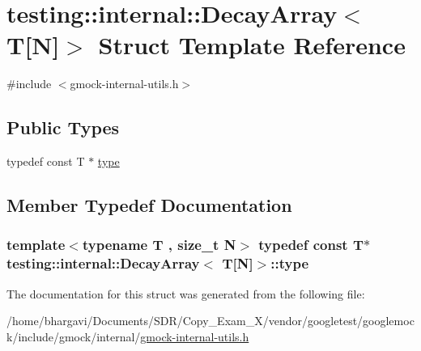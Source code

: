 \hypertarget{structtesting_1_1internal_1_1_decay_array_3_01_t[_n]_4}{}\section{testing\+:\+:internal\+:\+:Decay\+Array$<$ T\mbox{[}N\mbox{]}$>$ Struct Template Reference}
\label{structtesting_1_1internal_1_1_decay_array_3_01_t[_n]_4}


{\ttfamily \#include $<$gmock-\/internal-\/utils.\+h$>$}

\subsection*{Public Types}
\begin{DoxyCompactItemize}
\item 
typedef const T $\ast$ \hyperlink{structtesting_1_1internal_1_1_decay_array_3_01_t[_n]_4_afc22a88da484b94639501c07fb90bfd3}{type}
\end{DoxyCompactItemize}


\subsection{Member Typedef Documentation}
\subsubsection[{\texorpdfstring{type}{type}}]{\setlength{\rightskip}{0pt plus 5cm}template$<$typename T , size\+\_\+t N$>$ typedef const T$\ast$ {\bf testing\+::internal\+::\+Decay\+Array}$<$ T\mbox{[}N\mbox{]}$>$\+::{\bf type}}\hypertarget{structtesting_1_1internal_1_1_decay_array_3_01_t[_n]_4_afc22a88da484b94639501c07fb90bfd3}{}\label{structtesting_1_1internal_1_1_decay_array_3_01_t[_n]_4_afc22a88da484b94639501c07fb90bfd3}


The documentation for this struct was generated from the following file\+:\begin{DoxyCompactItemize}
\item 
/home/bhargavi/\+Documents/\+S\+D\+R/\+Copy\+\_\+\+Exam\+\_\+X/vendor/googletest/googlemock/include/gmock/internal/\hyperlink{gmock-internal-utils_8h}{gmock-\/internal-\/utils.\+h}\end{DoxyCompactItemize}

